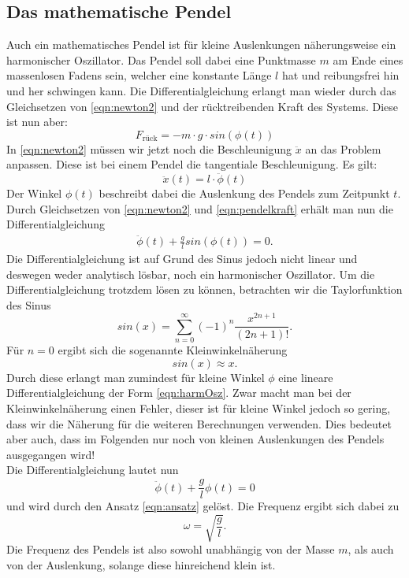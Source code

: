 \subsection{Das mathematische Pendel}
Auch ein mathematisches Pendel ist für kleine Auslenkungen näherungsweise ein harmonischer Oszillator. Das Pendel soll dabei eine
Punktmasse $m$ am Ende eines massenlosen Fadens sein, welcher eine konstante Länge $l$ hat und reibungsfrei hin und her schwingen kann.
Die Differentialgleichung erlangt man wieder durch das Gleichsetzen von \eqref{eqn:newton2} und der rücktreibenden Kraft des Systems.
Diese ist nun aber:
\begin{equation}
    F_\text{rück}=-m\cdot g\cdot sin(\phi(t)) \label{eqn:pendelkraft}
\end{equation}
In \eqref{eqn:newton2} müssen wir jetzt noch die Beschleunigung $\ddot x$ an das Problem anpassen. Diese ist bei einem Pendel die tangentiale
Beschleunigung. Es gilt:
\begin{equation}
    \ddot x(t)=l\cdot \ddot{\phi}(t)
\end{equation}
Der Winkel $\phi(t)$ beschreibt dabei die Auslenkung des Pendels zum Zeitpunkt $t$. Durch Gleichsetzen von \eqref{eqn:newton2} und
\eqref{eqn:pendelkraft} erhält man nun die Differentialgleichung
\begin{eqnarray}
    \ddot{\phi}(t)+\frac{g}{l}sin(\phi(t))=0.
\end{eqnarray}
Die Differentialgleichung ist auf Grund des Sinus jedoch nicht linear und deswegen weder analytisch lösbar, noch ein harmonischer Oszillator.
Um die Differentialgleichung trotzdem lösen zu können, betrachten wir die Taylorfunktion des Sinus
\begin{equation}
    sin(x)=\sum_{n=0}^\infty (-1)^n\frac{x^{2n+1}}{(2n+1)!}.
\end{equation}
Für $n=0$ ergibt sich die sogenannte Kleinwinkelnäherung
\begin{equation}
    sin(x)\approx x.
\end{equation}
Durch diese erlangt man zumindest für kleine Winkel $\phi$ eine lineare Differentialgleichung der Form \eqref{eqn:harmOsz}. Zwar macht man bei der
Kleinwinkelnäherung einen Fehler, dieser ist für kleine Winkel jedoch so gering, dass wir die Näherung für die weiteren Berechnungen verwenden.
Dies bedeutet aber auch, dass im Folgenden nur noch von kleinen Auslenkungen des Pendels ausgegangen wird!
\\
Die Differentialgleichung lautet nun
\begin{equation}
    \ddot{\phi}(t)+\frac{g}{l}\phi(t)=0
\end{equation}
und wird durch den Ansatz \eqref{eqn:ansatz} gelöst. Die Frequenz ergibt sich dabei zu
\begin{equation}
    \omega=\sqrt{\frac{g}{l}}.
\end{equation}
Die Frequenz des Pendels ist also sowohl unabhängig von der Masse $m$, als auch von der Auslenkung, solange diese hinreichend klein ist.

